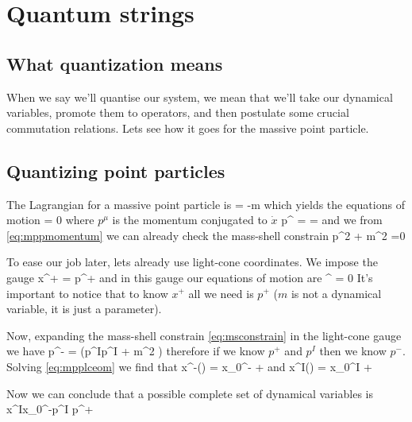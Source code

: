 \documentclass[oneside, 12pt]{book}
\begin{document}
\pagestyle{mypage2} \normalfont


\chapter{Quantum strings}

\section{What quantization means}

When we say we'll quantise our system, we mean that we'll take our dynamical variables, promote them to operators, and then postulate some crucial commutation relations. Lets see how it goes for the massive point particle.\par

\section{Quantizing point particles}

The Lagrangian for a massive point particle is
\beq[]  = -m \eeq
which yields the equations of motion
\beq[]  = 0 \eeq
where \(p^{\mu}\) is the momentum conjugated to \(\dot{x}\)
\beq[eq:mppmomentum] p^{\mu} =  =  \eeq
and we from \eqref{eq:mppmomentum} we can already check the mass-shell constrain
\beq[eq:msconstrain] p^2 + m^2 =0 \eeq\par

To ease our job later, lets already use light-cone coordinates. We impose the gauge
\beq[eq:x+] x^{+} = p^{+}\tau \eeq
and in this gauge our equations of motion are
\beq[eq:mpplceom] ^{\mu} = 0 \eeq
It's important to notice that to know \(x^{+}\) all we need is \(p^{+}\) (\(m\) is not a dynamical variable, it is just a parameter).\par

Now, expanding the mass-shell constrain \eqref{eq:msconstrain} in the light-cone gauge we have
\beq[eq:mpplcmsconstrain] p^{-} = \left(p^Ip^I + m^2 \right) \eeq
therefore if we know \(p^{+}\) and \(p^{I}\) then we know \(p^{-}\). Solving \eqref{eq:mpplceom} we find that
\beq[eq:mppx-] x^{-}(\tau) = x_0^{-} + \tau \eeq
and
\beq[eq:mppxI] x^I(\tau) = x_0^{I} + \tau \eeq \par

Now we can conclude that a possible complete set of dynamical variables is
\beq[eq:mppdynvar] x^I\qc x_0^{-}\qc p^I  p^{+} \eeq \par
\end{document}
